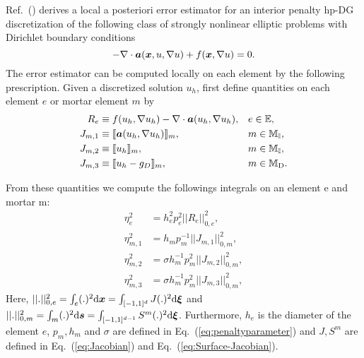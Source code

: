  Ref.~(\citet*{bi2015posteriori}) derives a local a posteriori
error estimator for an interior penalty hp-DG discretization of the
following class of strongly nonlinear elliptic problems with Dirichlet
boundary conditions
%
\begin{equation}
\label{eq:classofproblems}
-\nabla \cdot \boldsymbol{a}(\boldsymbol{x}, u, \nabla u) + f(\boldsymbol{x},\nabla u) = 0 .
\end{equation}
%
The error estimator can be computed locally on each element by the
following prescription.  Given a discretized solution $u_h$, first define  quantities on each element $e$ or mortar element $m$ by
%
\begin{subequations}
\label{eq:Eta2_Ingredients}
\begin{align}
R_{e} &\equiv f(u_{h}, \nabla u_{h}) - \nabla \cdot \boldsymbol{a}(u_{h}, \nabla u_{h}),
&& e\in \mathbb{E},\\
     J_{m,1} &\equiv \llbracket \boldsymbol{a}(u_{h}, \nabla u_{h}) \rrbracket_{m},
&&     m\in \mathbb{M_I},\\
     J_{m,2} &\equiv \llbracket u_h \rrbracket_{m},
     &&     m\in \mathbb{M_I},\\
     J_{m,3} &\equiv \llbracket  u_{h} - g_D \rrbracket_{m},
     &&     m\in \mathbb{M}_{\rm D}.
\end{align}
\end{subequations}

From these quantities we compute the followings integrals on an
element e and mortar m:
%
\begin{subequations}
\label{eq:Eta2_Integrals}
\begin{align}
\eta^{2}_{e} &= h^{2}_{e}p^{2}_{e}||R_{e}||^{2}_{0,e}, \\
\eta^{2}_{m,1} &= h_{m}p^{-1}_{m}||J_{m,1}||^{2}_{0,m }, \\
\eta^{2}_{m,2} &= \sigma h_{m}^{-1}p^{2}_{m}||J_{m,2}||^{2}_{0,m},\\
\eta^{2}_{m,3} &= \sigma h_{m}^{-1}p^{2}_{m}||J_{m,3}||^{2}_{0,m},
\end{align}
\end{subequations}
%
Here, $|| . ||^2_{0,e} = \int_e ( . )^2 \mathrm{d}\boldsymbol{x} = \int_{[-1,1]^d} J ( . )^2
\mathrm{d}\boldsymbol{\xi}$ and $|| . ||^2_{0,m} = \int_{m} ( . )^2 \mathrm{d} \boldsymbol{s} =
\int_{[-1,1]^{d-1}}S^m ( . )^2 \mathrm{d}\boldsymbol{\xi}$.
  Furthermore, $h_e$ is the diameter of the element $e$, $p_m, h_m$
  and $\sigma$ are defined in Eq.~(\ref{eq:penaltyparameter}) and $J,S^m$ are defined in Eq.~(\ref{eq:Jacobian}) and Eq.~(\ref{eq:Surface-Jacobian}).
  
